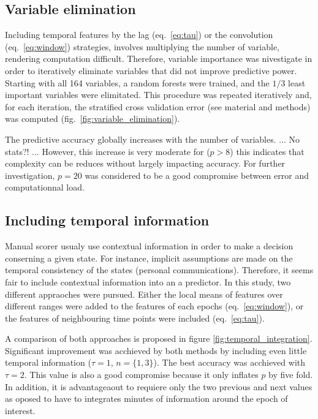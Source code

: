 \subsection{Variable elimination}
Including temporal features by the lag (eq.~\ref{eq:tau}) or the convolution (eq.~\ref{eq:window}) strategies, involves multiplying the number of variable, rendering computation difficult.
Therefore, variable importance was nivestigate in order to iteratively eliminate variables that did not improve predictive power.
Starting with all 164 variables, a random forests were trained, and the $1/3$ least important variables were elimitated.
This procedure was repeated iteratively and, for each iteration, the stratified cross validation error (see material and methods) was computed (fig.~\ref{fig:variable_elimination}).



The predictive accuracy globally increases with the number of variables.
...
No stats?!
...
However, this increase is very moderate for ($p>8$) this indicates that complexity can be reduces without largely impacting accuracy.
For further investigation, $p=20$ was considered to be a good compromise between error and computationnal load.

\subsection{Including temporal information}
Manual scorer usualy use contextual information in order to make a decision conserning a given state.
For instance, implicit assumptions are made on the temporal consistency of the states (personal communications).
Therefore, it seems fair to include contextual information into an a predictor.
In this study, two different appraoches were pursued.
Either the local means of features over different ranges were added to the features of each epochs (eq.~\ref{eq:window}), 
or the features of neighbouring time points were included (eq.~\ref{eq:tau}).

A comparison of both approaches is proposed in figure \ref{fig:temporal_integration}.
Significant improvement was acchieved by both methods by including even little temporal information ($\tau = 1$, $n=\{1,3\}$).
The best accuracy was acchieved with $\tau = 2$. 
This value is also a good compromise because it only inflates $p$ by five fold.
In addition, it is advantageaout to requiere only the two previous and next values as oposed to have to integrates minutes of information around the epoch of interest.

